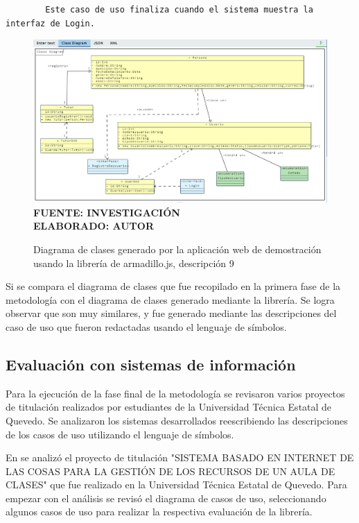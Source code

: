 \begin{itemize}
	\begin{lstlisting}
		Este caso de uso finaliza cuando el sistema muestra la interfaz de Login.\end{lstlisting}
	
	\begin{figure}[h!]
		\centering
		\caption{Diagrama de clases generado por la aplicación web de demostración usando la librería de armadillo.js, descripción 9}
		\includegraphics[width=15cm]{img/prueba09.png}
		\label{fig:prueba09}
		\vspace{4mm}
		{\footnotesize \textbf{\\ FUENTE: INVESTIGACIÓN} \textbf{\\ ELABORADO: AUTOR}}
	\end{figure}
	
\end{itemize}

Si se compara el diagrama de clases que fue recopilado en la primera fase de la metodología con el diagrama de clases generado mediante la librería. Se logra observar que son muy similares, y fue generado mediante las descripciones del caso de uso que fueron redactadas usando el lenguaje de símbolos.

\subsection{Evaluación con sistemas de información}

Para la ejecución de la fase final de la metodología se revisaron varios proyectos de titulación realizados por estudiantes de la Universidad Técnica Estatal de Quevedo. Se analizaron los sistemas desarrollados reescribiendo las descripciones de los casos de uso utilizando el lenguaje de símbolos.

En \cite{Villafuerte2020} se analizó el proyecto de titulación "SISTEMA BASADO EN INTERNET DE LAS COSAS PARA LA GESTIÓN DE LOS RECURSOS DE UN AULA DE CLASES" que fue realizado en la Universidad Técnica Estatal de Quevedo. Para empezar con el análisis se revisó el diagrama de casos de uso, seleccionando algunos casos de uso para realizar la respectiva evaluación de la librería. 

